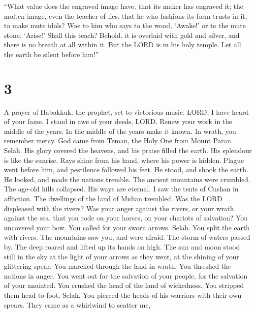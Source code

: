  ``What value does the engraved image have, that its
maker has engraved it; the molten image, even the teacher of lies, that
he who fashions its form trusts in it, to make mute idols?
 Woe to him who says to the wood, `Awake!' or to the mute
stone, `Arise!' Shall this teach? Behold, it is overlaid with gold and
silver, and there is no breath at all within it.  But the
LORD is in his holy temple. Let all the earth be silent before him!''

\hypertarget{section-2}{%
\section{3}\label{section-2}}

 A prayer of Habakkuk, the prophet, set to victorious
music.  LORD, I have heard of your fame. I stand in awe of
your deeds, LORD. Renew your work in the middle of the years. In the
middle of the years make it known. In wrath, you remember mercy.
 God came from Teman, the Holy One from Mount Paran.
Selah. His glory covered the heavens, and his praise filled the earth.
 His splendour is like the sunrise. Rays shine from his
hand, where his power is hidden.  Plague went before him,
and pestilence followed his feet.  He stood, and shook the
earth. He looked, and made the nations tremble. The ancient mountains
were crumbled. The age-old hills collapsed. His ways are eternal.
 I saw the tents of Cushan in affliction. The dwellings of
the land of Midian trembled.  Was the LORD displeased with
the rivers? Was your anger against the rivers, or your wrath against the
sea, that you rode on your horses, on your chariots of salvation?
 You uncovered your bow. You called for your sworn arrows.
Selah. You split the earth with rivers.  The mountains
saw you, and were afraid. The storm of waters passed by. The deep roared
and lifted up its hands on high.  The sun and moon stood
still in the sky at the light of your arrows as they went, at the
shining of your glittering spear.  You marched through
the land in wrath. You threshed the nations in anger. 
You went out for the salvation of your people, for the salvation of your
anointed. You crushed the head of the land of wickedness. You stripped
them head to foot. Selah.  You pierced the heads of his
warriors with their own spears. They came as a whirlwind to scatter me,
